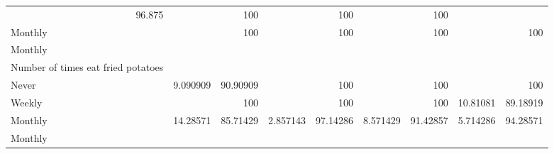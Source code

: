 \documentclass{article}
\begin{document}
\begin{tabular}{lllllllll}
  \multicolumn{1}{r}{96.875} &
  \multicolumn{1}{r}{} &
  \multicolumn{1}{r}{100} &
  \multicolumn{1}{r}{} &
  \multicolumn{1}{r}{100} &
  \multicolumn{1}{r}{} &
  \multicolumn{1}{r}{100} \\
\multicolumn{1}{l}{\hspace{7em}Monthly} &
  \multicolumn{1}{|r}{} &
  \multicolumn{1}{r}{100} &
  \multicolumn{1}{r}{} &
  \multicolumn{1}{r}{100} &
  \multicolumn{1}{r}{} &
  \multicolumn{1}{r}{100} &
  \multicolumn{1}{r}{} &
  \multicolumn{1}{r}{100} \\
\multicolumn{1}{l}{\hspace{5em}Monthly} &
  \multicolumn{1}{|r}{} &
  \multicolumn{1}{r}{} &
  \multicolumn{1}{r}{} &
  \multicolumn{1}{r}{} &
  \multicolumn{1}{r}{} &
  \multicolumn{1}{r}{} &
  \multicolumn{1}{r}{} &
  \multicolumn{1}{r}{} \\
\multicolumn{1}{l}{\hspace{6em}Number of times eat fried potatoes} &
  \multicolumn{1}{|r}{} &
  \multicolumn{1}{r}{} &
  \multicolumn{1}{r}{} &
  \multicolumn{1}{r}{} &
  \multicolumn{1}{r}{} &
  \multicolumn{1}{r}{} &
  \multicolumn{1}{r}{} &
  \multicolumn{1}{r}{} \\
\multicolumn{1}{l}{\hspace{7em}Never} &
  \multicolumn{1}{|r}{9.090909} &
  \multicolumn{1}{r}{90.90909} &
  \multicolumn{1}{r}{} &
  \multicolumn{1}{r}{100} &
  \multicolumn{1}{r}{} &
  \multicolumn{1}{r}{100} &
  \multicolumn{1}{r}{} &
  \multicolumn{1}{r}{100} \\
\multicolumn{1}{l}{\hspace{7em}Weekly} &
  \multicolumn{1}{|r}{} &
  \multicolumn{1}{r}{100} &
  \multicolumn{1}{r}{} &
  \multicolumn{1}{r}{100} &
  \multicolumn{1}{r}{} &
  \multicolumn{1}{r}{100} &
  \multicolumn{1}{r}{10.81081} &
  \multicolumn{1}{r}{89.18919} \\
\multicolumn{1}{l}{\hspace{7em}Monthly} &
  \multicolumn{1}{|r}{14.28571} &
  \multicolumn{1}{r}{85.71429} &
  \multicolumn{1}{r}{2.857143} &
  \multicolumn{1}{r}{97.14286} &
  \multicolumn{1}{r}{8.571429} &
  \multicolumn{1}{r}{91.42857} &
  \multicolumn{1}{r}{5.714286} &
  \multicolumn{1}{r}{94.28571} \\
\multicolumn{1}{l}{\hspace{3em}Monthly} &
  \multicolumn{1}{|r}{} &
  \multicolumn{1}{r}{} &
  \multicolumn{1}{r}{} &
  \multicolumn{1}{r}{} &
  \multicolumn{1}{r}{} &
  \multicolumn{1}{r}{} &
  \multicolumn{1}{r}{} &
  \multicolumn{1}{r}{} \\

\end{tabular}
\end{document}
